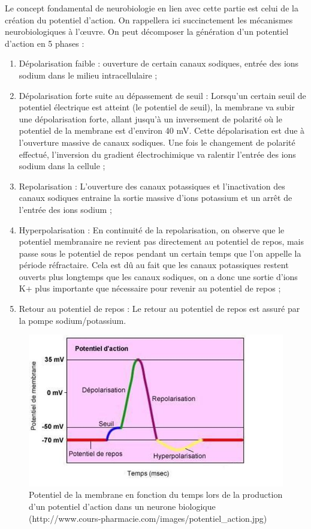 \documentclass[12pt]{scrartcl}
\begin{document}
Le concept fondamental de neurobiologie en lien avec cette partie est celui de la création du potentiel d'action. On rappellera ici succinctement les mécanismes neurobiologiques à l'œuvre. On peut décomposer la génération d'un potentiel d'action en 5 phases :
\begin{enumerate} \item Dépolarisation faible : ouverture de certain canaux sodiques, entrée des ions sodium dans le milieu intracellulaire ;
\item Dépolarisation forte suite au dépassement de seuil : Lorsqu'un certain seuil de potentiel électrique est atteint (le potentiel de seuil), la membrane va subir une dépolarisation forte, allant jusqu'à un inversement de polarité où le potentiel de la membrane est d'environ 40 mV. Cette dépolarisation est due à l'ouverture massive de canaux sodiques. Une fois le changement de polarité effectué, l'inversion du gradient électrochimique va ralentir l'entrée des ions sodium dans la cellule ;
\item Repolarisation : L'ouverture des canaux potassiques et l'inactivation des canaux sodiques entraine la sortie massive d'ions potassium et un arrêt de l'entrée des ions sodium ;
\item Hyperpolarisation : En continuité de la repolarisation, on observe que le potentiel membranaire ne revient pas directement au potentiel de repos, mais passe sous le potentiel de repos pendant un certain temps que l'on appelle la période réfractaire. Cela est dû au fait que les canaux potassiques restent ouverts plus longtemps que les canaux sodiques, on a donc une sortie d'ions K+ plus importante que nécessaire pour revenir au potentiel de repos ;
\item Retour au potentiel de repos : Le retour au potentiel de repos est assuré par la pompe sodium/potassium.
\end{enumerate}

\begin{figure}[!h]
\centering
\includegraphics{imgs/2.JPG}
\caption{Potentiel de la membrane en fonction du temps lors de la production d'un potentiel d'action dans un neurone biologique \scriptsize{(http://www.cours-pharmacie.com/images/potentiel\_action.jpg)}}
\end{figure}
\end{document}
